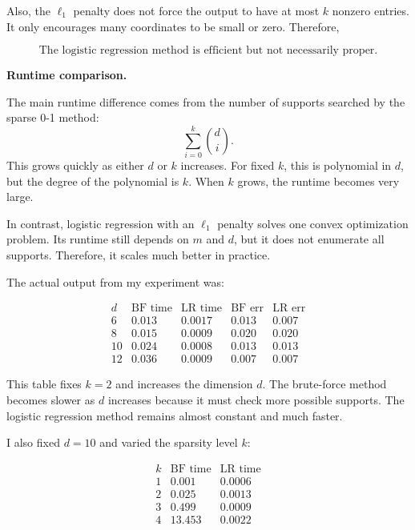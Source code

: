 \documentclass[11pt]{article}
\begin{document}
\begin{enumerate}
\begin{solutionbox}
        Also, the $\ell_1$ penalty does not force the output to have at most $k$ nonzero entries.
        It only encourages many coordinates to be small or zero. Therefore,

        \[
        \boxed{
        \text{The logistic regression method is efficient but not necessarily proper.}
        }
        \]

        \medskip

        \textbf{Runtime comparison.}

        The main runtime difference comes from the number of supports searched by the sparse
        0-1 method:
        \[
        \sum_{i=0}^k {d\choose i}.
        \]
        This grows quickly as either $d$ or $k$ increases. For fixed $k$, this is polynomial in
        $d$, but the degree of the polynomial is $k$. When $k$ grows, the runtime becomes very
        large.

        In contrast, logistic regression with an $\ell_1$ penalty solves one convex optimization
        problem. Its runtime still depends on $m$ and $d$, but it does not enumerate all supports.
        Therefore, it scales much better in practice.

        The actual output from my experiment was:

        \[
        \begin{array}{c|c|c|c|c}
        d & \text{BF time} & \text{LR time} & \text{BF err} & \text{LR err}\\
        \hline
        6  & 0.013 & 0.0017 & 0.013 & 0.007\\
        8  & 0.015 & 0.0009 & 0.020 & 0.020\\
        10 & 0.024 & 0.0008 & 0.013 & 0.013\\
        12 & 0.036 & 0.0009 & 0.007 & 0.007
        \end{array}
        \]

        This table fixes $k=2$ and increases the dimension $d$. The brute-force method becomes
        slower as $d$ increases because it must check more possible supports. The logistic
        regression method remains almost constant and much faster.

        I also fixed $d=10$ and varied the sparsity level $k$:

        \[
        \begin{array}{c|c|c}
        k & \text{BF time} & \text{LR time}\\
        \hline
        1 & 0.001 & 0.0006\\
        2 & 0.025 & 0.0013\\
        3 & 0.499 & 0.0009\\
        4 & 13.453 & 0.0022
        \end{array}
        \]


\end{solutionbox}
\end{enumerate}
\end{document}
